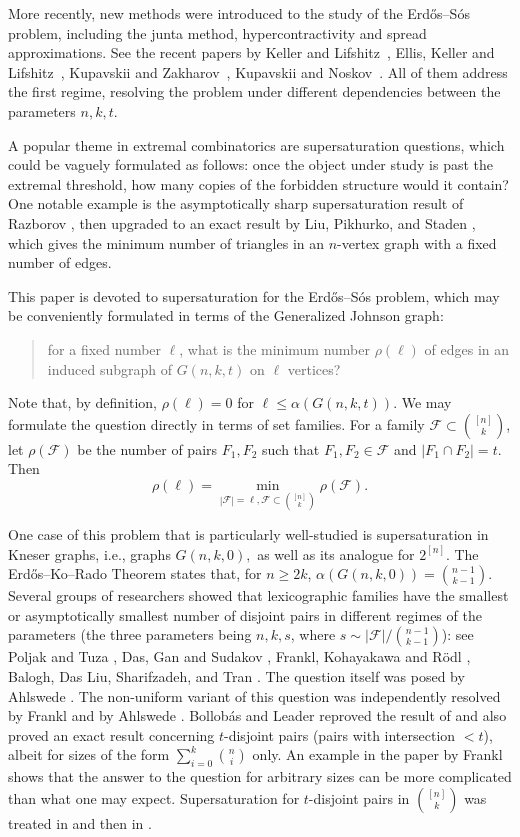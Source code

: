 \documentclass[12pt,a4paper]{article}
\newcommand{\ff}{\mathcal{F}}
\begin{document}
More recently, new methods were introduced to the study of the Erd\H os--S\'os problem, including the junta method, hypercontractivity and spread approximations. See the recent papers by Keller and Lifshitz~\cite{KL},  Ellis, Keller and Lifshitz~\cite{EKL}, Kupavskii and Zakharov~\cite{KZ}, Kupavskii and Noskov~\cite{KN}. All of them address the first  regime, resolving the problem under different dependencies between the parameters $n,k,t$.

A popular theme in extremal combinatorics are supersaturation questions, which could be vaguely formulated as follows: once the object under study is past the extremal threshold, how many copies of the forbidden structure would it contain? One notable example is the asymptotically sharp supersaturation result of Razborov \cite{Raz}, then upgraded to an exact result by Liu, Pikhurko, and Staden \cite{LPS}, which gives the minimum number of triangles in an $n$-vertex graph with a fixed number of edges.

This paper is devoted to supersaturation for the Erd\H os--S\'os problem, which  may be conveniently formulated in terms of the Generalized Johnson graph: \begin{quote}
    for a fixed number $\ell$, what is the minimum number $\rho(\ell)$ of edges in an induced subgraph of $G(n,k,t)$ on $\ell$ vertices?
    \end{quote}
Note that, by definition, $\rho(\ell)=0$ for $\ell\le \alpha(G(n,k,t)).$ We may formulate the question directly in terms of set families. For a family $\mathcal{F} \subset\binom{[n]}{k}$, let $\rho(\mathcal{F})$ be the number of pairs $F_1, F_2$ such that $F_1, F_2 \in \mathcal{F}$ and $|F_1 \cap F_2| =t.$ Then
$$\rho(\ell) = \min_{|\mathcal{F}|=\ell, \mathcal{F} \subset\binom{[n]}{k}} \rho(\mathcal{F}).$$

One case of this problem that is particularly well-studied is supersaturation in Kneser graphs, i.e., graphs $G(n,k,0),$ as well as its analogue for $2^{[n]}.$ The Erd\H os--Ko--Rado Theorem states that, for $n\ge 2k$, $\alpha(G(n,k,0))={n-1\choose k-1}.$ Several groups of researchers showed that lexicographic families have the smallest  or asymptotically smallest number of disjoint pairs in different regimes of the parameters (the three parameters being $n,k,s$, where $s\sim |\ff|/{n-1\choose k-1}$): see Poljak and Tuza \cite{PT}, Das, Gan and Sudakov \cite{DGS}, Frankl, Kohayakawa and R\"odl \cite{FKR}, Balogh, Das Liu, Sharifzadeh, and Tran \cite{BDLST}. The question itself was posed by Ahlswede \cite{Ahl}. The non-uniform variant of this question was independently resolved by Frankl \cite{Fr17} and by Ahlswede \cite{Ahl}. Bollob\'as and Leader \cite{BL} reproved the result of \cite{Fr17, Ahl} and also proved an exact result concerning $t$-disjoint pairs (pairs with intersection $< t$), albeit for sizes of the form $\sum_{i=0}^k{n\choose i}$ only. An example in the paper by Frankl \cite{Fr17} shows that the answer to the question for arbitrary sizes can be more complicated than what one may expect. Supersaturation for $t$-disjoint pairs in ${[n]\choose k}$ was treated in \cite{DGS} and then in \cite{FKR}.
\end{document}
